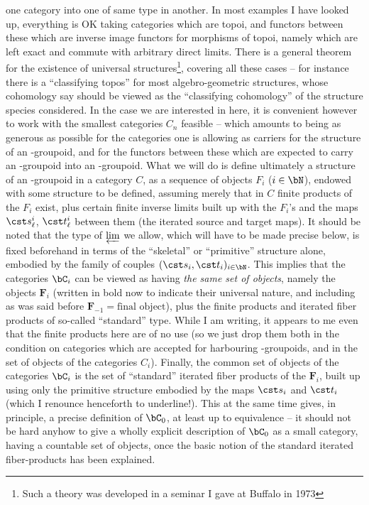 one category into one of same type in another. In most examples I have
looked up, everything is OK taking categories which are topoi, and
functors between these which are inverse image functors for morphisms
of topoi, namely which are left exact and commute with arbitrary
direct limits. There is a general theorem for the existence of
universal structures\footnote{Such a theory was developed in a seminar I gave at Buffalo in 1973}, covering all these cases -- for instance there
is a ``classifying topos'' for most algebro-geometric structures,
whose cohomology say should be viewed as the ``classifying
cohomology'' of the structure species considered. In the case we are
interested in here, it is convenient however to work with the smallest
categories $C_n$ feasible -- which amounts to being as generous as
possible for the categories one is allowing as carriers for the
structure of an \oo-groupoid, and for the functors between these which
are expected to carry an \oo-groupoid into an \oo-groupoid. What we
will do is define ultimately a structure of an \oo-groupoid in a
category $C$, as a sequence of objects $F_i$ ($i\in\bN$), endowed with
some structure to be defined, assuming merely that in $C$
finite products of the $F_i$ exist, plus certain finite inverse limits
built up with the $F_i$'s and the maps $\cst s_\ell^i$, $\cst
t_\ell^i$ between them (the iterated source and target maps). It
should be noted that the type of $\varprojlim$ we allow, which will
have to be made precise below, is fixed beforehand in terms of the
``skeletal'' or ``primitive'' structure alone, embodied by the family
of couples $(\cst s_i, \cst t_i)_{i\in\bN}$. This implies that the
categories $\bC_i$ can be viewed as having \emph{the same set of
  objects}, namely the objects $\boldsymbol F_i$ (written
in bold now to indicate their
universal nature, and including as was said before $\boldsymbol F_{-1} =
\text{final object}$), plus the finite products and iterated fiber
products of so-called ``standard'' type. While I am writing, it
appears to me even that the finite products here are of no use (so we
just drop them both in the condition on categories which are accepted
for harbouring \oo-groupoids, and in the set of objects of the
categories $C_i$). Finally, the common set of objects of the
categories $\bC_i$ is the set of ``standard'' iterated fiber
products of the $\boldsymbol F_i$, built up using only the primitive
structure embodied by the maps $\cst s_i$ and $\cst
t_i$ (which I renounce henceforth to underline!).
This at the same time gives, in principle, a precise definition of
$\bC_0$, at least up to equivalence -- it should not be hard anyhow
to give a wholly explicit description of $\bC_0$ as a small
category, having a countable set of objects, once the basic notion of
the standard iterated fiber-products has been explained.

